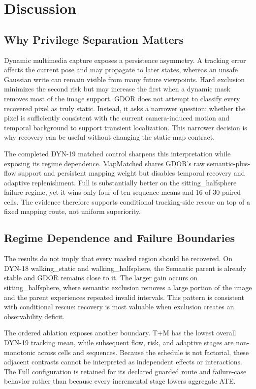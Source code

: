 \section{Discussion}

\subsection{Why Privilege Separation Matters}

Dynamic multimedia capture exposes a persistence asymmetry.
A tracking error affects the current pose and may propagate to later states, whereas an unsafe Gaussian write can remain visible from many future viewpoints.
Hard exclusion minimizes the second risk but may increase the first when a dynamic mask removes most of the image support.
GDOR does not attempt to classify every recovered pixel as truly static.
Instead, it asks a narrower question: whether the pixel is sufficiently consistent with the current camera-induced motion and temporal background to support transient localization.
This narrower decision is why recovery can be useful without changing the static-map contract.

The completed DYN-19 matched control sharpens this interpretation while exposing its regime dependence.
MapMatched shares GDOR's raw semantic-plus-flow support and persistent mapping weight but disables temporal recovery and adaptive replenishment.
Full is substantially better on the sitting\_halfsphere failure regime, yet it wins only four of ten sequence means and 16 of 30 paired cells.
The evidence therefore supports conditional tracking-side rescue on top of a fixed mapping route, not uniform superiority.

\subsection{Regime Dependence and Failure Boundaries}

The results do not imply that every masked region should be recovered.
On DYN-18 walking\_static and walking\_halfsphere, the Semantic parent is already stable and GDOR remains close to it.
The larger gain occurs on sitting\_halfsphere, where semantic exclusion removes a large portion of the image and the parent experiences repeated invalid intervals.
This pattern is consistent with conditional rescue: recovery is most valuable when exclusion creates an observability deficit.

The ordered ablation exposes another boundary.
T+M has the lowest overall DYN-19 tracking mean, while subsequent flow, risk, and adaptive stages are non-monotonic across cells and sequences.
Because the schedule is not factorial, these adjacent contrasts cannot be interpreted as independent effects or interactions.
The Full configuration is retained for its declared guarded route and failure-case behavior rather than because every incremental stage lowers aggregate ATE.

